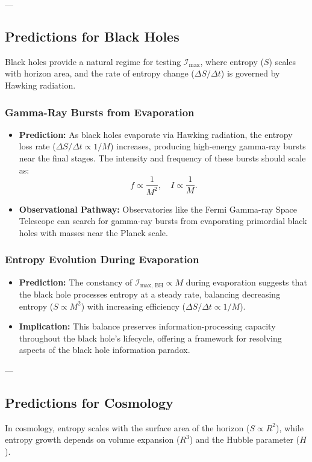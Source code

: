 \documentclass[12pt]{article}
\begin{document}
---

\subsection{Predictions for Black Holes}
Black holes provide a natural regime for testing \( \mathcal{I}_{\text{max}} \), where entropy (\( S \)) scales with horizon area, and the rate of entropy change (\( \Delta S / \Delta t \)) is governed by Hawking radiation.

\subsubsection{Gamma-Ray Bursts from Evaporation}
\begin{itemize}
    \item \textbf{Prediction:} As black holes evaporate via Hawking radiation, the entropy loss rate (\( \Delta S / \Delta t \propto 1/M \)) increases, producing high-energy gamma-ray bursts near the final stages. The intensity and frequency of these bursts should scale as:
    \[
    f \propto \frac{1}{M^2}, \quad I \propto \frac{1}{M}.
    \]

    \item \textbf{Observational Pathway:} Observatories like the Fermi Gamma-ray Space Telescope can search for gamma-ray bursts from evaporating primordial black holes with masses near the Planck scale.
\end{itemize}

\subsubsection{Entropy Evolution During Evaporation}
\begin{itemize}
    \item \textbf{Prediction:} The constancy of \( \mathcal{I}_{\text{max, BH}} \propto M \) during evaporation suggests that the black hole processes entropy at a steady rate, balancing decreasing entropy (\( S \propto M^2 \)) with increasing efficiency (\( \Delta S / \Delta t \propto 1/M \)).

    \item \textbf{Implication:} This balance preserves information-processing capacity throughout the black hole’s lifecycle, offering a framework for resolving aspects of the black hole information paradox.
\end{itemize}

---

\subsection{Predictions for Cosmology}
In cosmology, entropy scales with the surface area of the horizon (\( S \propto R^2 \)), while entropy growth depends on volume expansion (\( R^3 \)) and the Hubble parameter (\( H \)).
\end{document}
